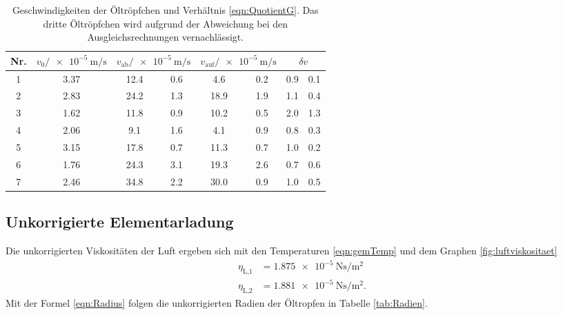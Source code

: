 \begin{table}[h]
  \centering
  \begin{tabular}{S S S[table-format=2.1] @{${}\pm{}$} S[table-format=1.1]
    S[table-format=2.1] @{${}\pm{}$} S[table-format=1.1] S @{${}\pm{}$} S}
    \toprule
    {Nr.} & {$v_0/\SI{e-5}{\meter\per\second}$} &  &
     &  \\
     & 3.37 & 12.4 & 0.6 & 4.6  & 0.2 & 0.9 & 0.1 \\
    2 & 2.83 & 24.2 & 1.3 & 18.9 & 1.9 & 1.1  & 0.4 \\
    3 & 1.62 & 11.8 & 0.9 & 10.2 & 0.5 & 2.0  & 1.3 \\
    4 & 2.06 & 9.1  & 1.6 & 4.1  & 0.9 & 0.8 & 0.3 \\
    5 & 3.15 & 17.8 & 0.7 & 11.3 & 0.7 & 1.0 & 0.2 \\
    6 & 1.76 & 24.3 & 3.1 & 19.3 & 2.6 & 0.7  & 0.6 \\
    7 & 2.46 & 34.8 & 2.2 & 30.0 & 0.9 & 1.0  & 0.5 \\
    \bottomrule
  \end{tabular}
  \caption{Geschwindigkeiten der Öltröpfchen und Verhältnis
  \eqref{eqn:QuotientG}. Das dritte Öltröpfchen wird aufgrund der Abweichung
  bei den Ausgleichsrechnungen vernachlässigt.}
  \label{tab:Geschw}
\end{table}

\FloatBarrier

\subsection{Unkorrigierte Elementarladung}
\label{sec:unkoel}

Die unkorrigierten Viskositäten der Luft ergeben sich mit den Temperaturen
\eqref{eqn:gemTemp} und dem Graphen \ref{fig:luftviskositaet}
\begin{align}
  \eta_\text{L,1} & = \SI{1.875e-5}{\newton\second\per\square\meter} \\
  \eta_\text{L,2} & = \SI{1.881e-5}{\newton\second\per\square\meter}.
\end{align}
Mit der Formel \eqref{eqn:Radius} folgen die unkorrigierten Radien der Öltropfen
in Tabelle \ref{tab:Radien}.

